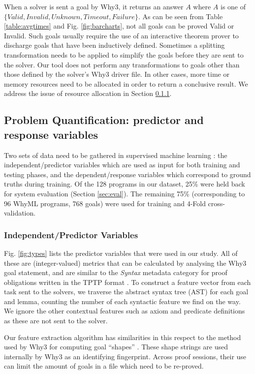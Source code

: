 \documentclass[runningheads,a4paper]{llncs}
\begin{document}
When a solver is sent a goal by \textsf{Why3}, it returns an answer $A$ where $A$ is one of $\lbrace Valid,Invalid,Unknown,Timeout,Failure \rbrace$. As can be seen from Table \ref{table:avgtimes} and Fig. \ref{fig:barcharts}, not all goals can be proved Valid or Invalid. Such goals usually require the use of an interactive theorem prover to discharge goals that have been inductively defined. Sometimes a splitting transformation needs to be applied to simplify the goals before they are sent to the solver. Our tool does not perform any transformations to goals other than those defined by the solver's \textsf{Why3} driver file. In other cases, more time or memory resources need to be allocated in order to return a conclusive result. We address the issue of resource allocation in Section \ref{sec:independant}.     

\subsection{Problem Quantification: predictor and response variables}

Two sets of data need to be gathered in supervised machine learning \cite{Mitchell}: the independent/predictor variables which are used as input for both training and testing phases, and the dependent/response variables which correspond to ground truths during training. Of the 128 programs in our dataset, 25\% were held back for system evaluation (Section \ref{sec:eval}). The remaining 75\% (corresponding to 96 WhyML programs, 768 goals) were used for training and 4-Fold cross-validation.

\subsubsection{Independent/Predictor Variables}
\label{sec:independant}
Fig. \ref{fig:types} lists the predictor variables that were used in our study.  All of these are (integer-valued) metrics that can be calculated by analysing the \textsf{Why3} goal statement, and are similar to the \textit{Syntax} metadata category for proof obligations written in the TPTP format \cite{TPTP}. To construct a feature vector from each task sent to the solvers, we traverse the abstract syntax tree (AST) for each goal and lemma, counting the number of each syntactic feature we find on the way. We ignore the other contextual features such as axiom and predicate definitions as these are not sent to the solver. 

Our feature extraction algorithm has similarities in this respect to the method used by \textsf{Why3} for computing goal ``shapes'' \cite{why:preserving}. These shape strings are used internally by \textsf{Why3} as an identifying fingerprint. Across proof sessions, their use can limit the amount of goals in a file which need to be re-proved.   
\end{document}
